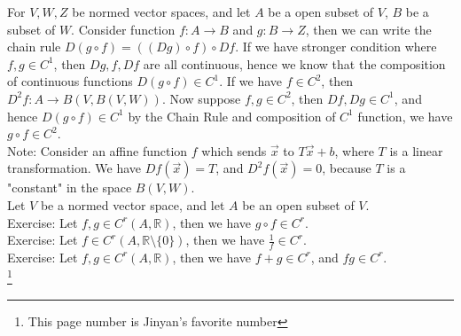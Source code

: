 \documentclass[11pt,oneside]{book}
\theoremstyle{break}
\theoremstyle{break}
\newcommand{\R}{\mathbb{R}}
\newcommand{\note}{\color{red}Note: \color{black}}
\newcommand{\exercise}{\color{green}Exercise: \color{black}}
\newcommand\blfootnote[1]{%
  \begingroup
  \renewcommand\thefootnote{}\footnote{#1}%
  \addtocounter{footnote}{-1}%
  \endgroup
}
\begin{document}
For $V,W,Z$ be normed vector spaces, and let $A$ be a open subset of $V$, $B$ be a subset of $W$. Consider function $f:A \to B$ and $g:B \to Z$, then we can write the chain rule $D(g\circ f) = ((Dg)\circ f) \circ Df$. If we have stronger condition where $f,g \in C^1$, then $Dg,f,Df$ are all continuous, hence we know that the composition of continuous functions $D(g\circ f)\in C^1$. If we have $f \in C^2$, then $D^2f:A \to B(V,B(V,W))$.
Now suppose $f,g \in C^2$, then $Df,Dg\in C^1$, and hence $D(g\circ f) \in C^1$ by the Chain Rule and composition of $C^1$ function, we have $g\circ f \in C^2$. \\ 

\note Consider an affine function $f$ which sends $\vec{x}$ to $T\vec{x}+b$, where $T$ is a linear transformation. We have $Df(\vec{x}) = T$, and $D^2f(\vec{x})=0$, because $T$ is a "constant" in the space $B(V,W)$.  \\

Let $V$ be a normed vector space, and let $A$ be an open subset of $V$.\\
\exercise Let $f,g \in C^r(A,\R)$, then we have $g\circ f \in C^r$.\\
\exercise Let $f \in C^r(A,\R\setminus\{0\})$, then we have $\frac{1}{f}\in C^r$.\\
\exercise Let $f,g \in C^r(A,\R)$, then we have $f+g \in C^r$, and $fg \in C^r$.\\


\blfootnote{This page number is Jinyan's favorite number}
\end{document}
